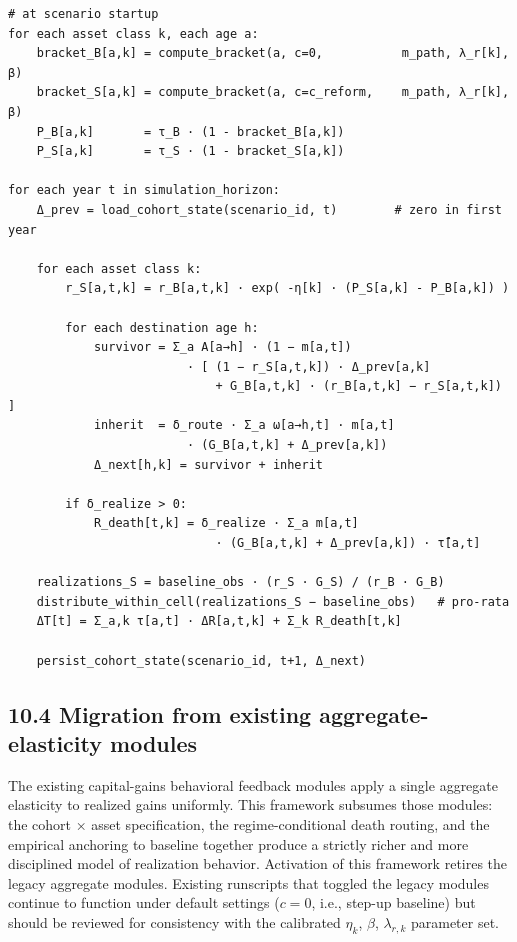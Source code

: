 \documentclass[11pt]{article}
\begin{document}
\begin{verbatim}
# at scenario startup
for each asset class k, each age a:
    bracket_B[a,k] = compute_bracket(a, c=0,           m_path, λ_r[k], β)
    bracket_S[a,k] = compute_bracket(a, c=c_reform,    m_path, λ_r[k], β)
    P_B[a,k]       = τ_B · (1 - bracket_B[a,k])
    P_S[a,k]       = τ_S · (1 - bracket_S[a,k])

for each year t in simulation_horizon:
    Δ_prev = load_cohort_state(scenario_id, t)        # zero in first year

    for each asset class k:
        r_S[a,t,k] = r_B[a,t,k] · exp( -η[k] · (P_S[a,k] - P_B[a,k]) )

        for each destination age h:
            survivor = Σ_a A[a→h] · (1 − m[a,t])
                         · [ (1 − r_S[a,t,k]) · Δ_prev[a,k]
                             + G_B[a,t,k] · (r_B[a,t,k] − r_S[a,t,k]) ]
            inherit  = δ_route · Σ_a ω[a→h,t] · m[a,t]
                         · (G_B[a,t,k] + Δ_prev[a,k])
            Δ_next[h,k] = survivor + inherit

        if δ_realize > 0:
            R_death[t,k] = δ_realize · Σ_a m[a,t]
                             · (G_B[a,t,k] + Δ_prev[a,k]) · τ̄[a,t]

    realizations_S = baseline_obs · (r_S · G_S) / (r_B · G_B)
    distribute_within_cell(realizations_S − baseline_obs)   # pro-rata
    ΔT[t] = Σ_a,k τ[a,t] · ΔR[a,t,k] + Σ_k R_death[t,k]

    persist_cohort_state(scenario_id, t+1, Δ_next)
\end{verbatim}

\subsection*{10.4 Migration from existing aggregate-elasticity modules}

The existing capital-gains behavioral feedback modules apply a single aggregate elasticity to realized gains uniformly. This framework subsumes those modules: the cohort × asset specification, the regime-conditional death routing, and the empirical anchoring to baseline together produce a strictly richer and more disciplined model of realization behavior. Activation of this framework retires the legacy aggregate modules. Existing runscripts that toggled the legacy modules continue to function under default settings ($c = 0$, i.e., step-up baseline) but should be reviewed for consistency with the calibrated $\eta_k$, $\beta$, $\lambda_{r,k}$ parameter set.
\end{document}
